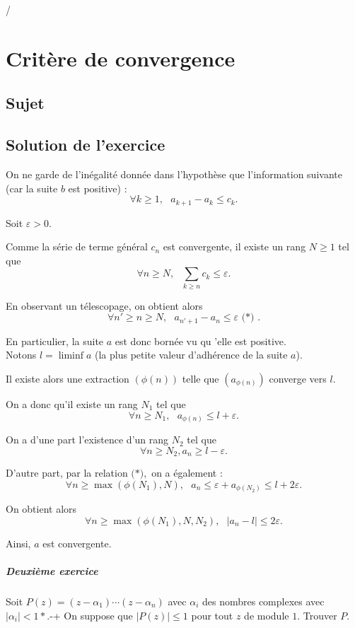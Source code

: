 /\chapter{Critère de convergence}

\section{Sujet}


\section{Solution de l'exercice}

On ne garde de l'inégalité donnée dans l'hypothèse que l'information suivante (car la suite $b$ est positive) : 
$$\forall k\geq 1,\mbox{ } a_{k+1}-a_{k}\leq c_{k}.$$

Soit $\varepsilon>0.$

Comme la série de terme général $c_{n}$ est convergente, il existe un rang $N\geq 1$ tel que $$\forall n\geq N,\mbox{ } \sum_{k\geq n}c_{k}\leq \varepsilon.$$

En observant un télescopage, on obtient alors
$$\forall n'\geq n\geq N, \mbox{ } a_{n'+1}-a_{n}\leq \varepsilon \mbox{ (*) }.$$

En particulier, la suite $a$ est donc bornée vu qu 'elle est positive.\\

Notons $l=\liminf a$ (la plus petite valeur d'adhérence de la suite $a$).

Il existe alors une extraction $(\phi(n))$ telle que $(a_{\phi(n)})$ converge vers $l.$

On a donc qu'il existe un rang $N_{1}$ tel que $$\forall n\geq N_{1},\mbox{ } a_{\phi(n)}\leq l+\varepsilon.$$

On a d'une part l'existence d'un rang $N_{2}$ tel que $$\forall n\geq N_{2}, a_{n}\geq l-\varepsilon.$$

D'autre part, par la relation $\mbox{(*)},$ on a également : $$\forall n\geq \max{(\phi(N_{1}),N)},\mbox{ } a_{n}\leq \varepsilon + a_{\phi(N_{2})}\leq l+2\varepsilon.$$

On obtient alors $$\forall n\geq \max{(\phi(N_{1}),N,N_{2})},\mbox{ } \vert a_{n}-l\vert \leq 2\varepsilon.$$

Ainsi, $a$ est convergente.

\paragraph{Deuxième exercice}
Soit $P(z) = (z-\alpha_1)\cdots(z-\alpha_n)$ avec $\alpha_i$ des nombres complexes avec $|\alpha_i| < 1*$.-+
On suppose que $|P(z)| \leqslant 1$ pour tout $z$ de module $1$.
Trouver $P$.


